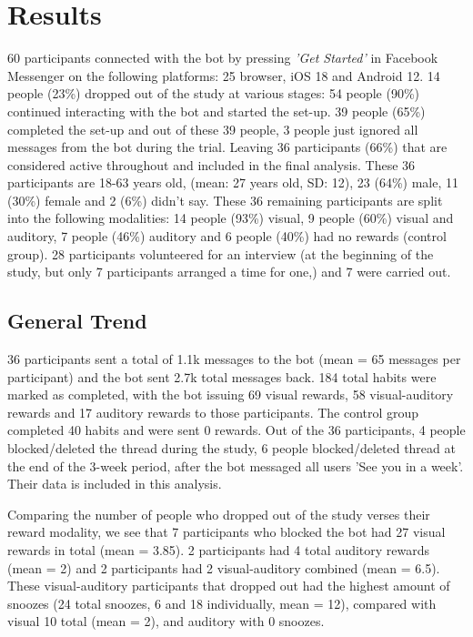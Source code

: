 \documentclass{scaffold/sigchi}
\begin{document}
\section{Results}
60 participants connected with the bot by pressing \textit{'Get Started'} in Facebook Messenger on the following platforms: 25 browser, iOS 18 and Android 12. 14 people (23\%) dropped out of the study at various stages: 54 people (90\%) continued interacting with the bot and started the set-up. 39 people (65\%) completed the set-up and out of these 39 people, 3 people just ignored all messages from the bot during the trial. Leaving 36 participants (66\%) that are considered active throughout and included in the final analysis. These 36 participants are 18-63 years old, (mean: 27 years old, SD: 12), 23 (64\%) male, 11 (30\%) female and 2 (6\%) didn't say. These 36 remaining participants are split into the following modalities: 14 people (93\%) visual, 9 people (60\%) visual and auditory, 7 people (46\%) auditory and 6 people (40\%) had no rewards (control group). 28 participants volunteered for an interview (at the beginning of the study, but only 7 participants arranged a time for one,) and 7 were carried out.


\subsection{General Trend}
36 participants sent a total of 1.1k messages to the bot (mean = 65 messages per participant) and the bot sent 2.7k total messages back. 184 total habits were marked as completed, with the bot issuing 69 visual rewards, 58 visual-auditory rewards and 17 auditory rewards to those participants. The control group completed 40 habits and were sent 0 rewards. Out of the 36 participants, 4 people blocked/deleted the thread during the study, 6 people blocked/deleted thread at the end of the 3-week period, after the bot messaged all users 'See you in a week'. Their data is included in this analysis.


Comparing the number of people who dropped out of the study verses their reward modality, we see that 7 participants who blocked the bot had 27 visual rewards in total (mean = 3.85). 2 participants had 4 total auditory rewards (mean = 2) and 2 participants had 2 visual-auditory combined (mean = 6.5). These visual-auditory participants that dropped out had the highest amount of snoozes (24 total snoozes, 6 and 18 individually, mean = 12), compared with visual 10 total (mean = 2), and auditory with 0 snoozes.
\end{document}
